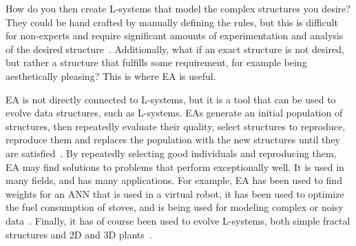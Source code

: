 How do you then create L-systems that model the complex structures you desire?
They could be hand crafted by manually defining the rules, but this is difficult for non-experts and require significant amounts of experimentation and analysis of the desired structure~\cite{1993McCormack}.
Additionally, what if an exact structure is not desired, but rather a structure that fulfills some requirement, for example being aesthetically pleasing?
This is where \gls{EA} is useful.

\gls{EA} is not directly connected to L-systems, but it is a tool that can be used to evolve data structures, such as \glspl{L-system}.
\glspl{EA} generate an initial population of structures, then repeatedly evaluate their quality, select structures to reproduce, reproduce them and replaces the population with the new structures until they are satisfied~\cite{2006AshlockEA}.
By repeatedly selecting good individuals and reproducing them, \gls{EA} may find solutions to problems that perform exceptionally well.
It is used in many fields, and has many applications.
For example, \gls{EA} has been used to find weights for an \gls{ANN} that is used in a virtual robot, it has been used to optimize the fuel consumption of stoves, and is being used for modeling complex or noisy data~\cite{2006AshlockEA}.
Finally, it has of course been used to evolve L-systems, both simple fractal structures and 2D and 3D plants~\cite{1998Mock,1998Ochoa,2002Ebner,2003Ebner,2006Ashlock,2009Beaumont,2009Corchado,1994Jacob,2000Vanak,2001Hornby,1995Jacob, 1996Jacob, 1996Jacob-2}.



